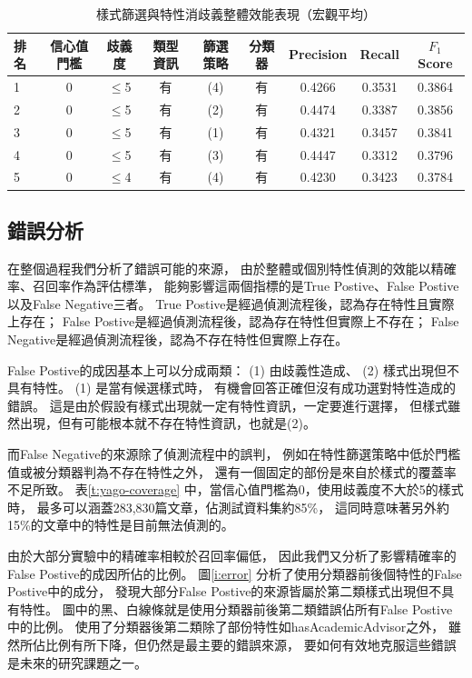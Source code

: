 \begin{table}
    \caption{樣式篩選與特性消歧義整體效能表現（宏觀平均）}
    \label{t:dis-ambi-overall-nbc}
    \footnotesize
    \begin{center}
        \begin{tabular}{|l||c|c||c|c|c||c|c|c|}
            \hline
            排名 & 信心值門檻 & 歧義度 & 類型資訊 & 篩選策略 & 分類器 & Precision & Recall & $F_1$ Score \\
            \hline
            1 & 0 & $\leq$5 & 有 & (4) & 有 & 0.4266 & 0.3531 & 0.3864 \\
            2 & 0 & $\leq$5 & 有 & (2) & 有 & 0.4474 & 0.3387 & 0.3856 \\
            3 & 0 & $\leq$5 & 有 & (1) & 有 & 0.4321 & 0.3457 & 0.3841 \\
            4 & 0 & $\leq$5 & 有 & (3) & 有 & 0.4447 & 0.3312 & 0.3796 \\
            5 & 0 & $\leq$4 & 有 & (4) & 有 & 0.4230 & 0.3423 & 0.3784 \\
            \hline
        \end{tabular}
    \end{center}
\end{table}

\subsection{錯誤分析}

在整個過程我們分析了錯誤可能的來源，
由於整體或個別特性偵測的效能以精確率、召回率作為評估標準，
能夠影響這兩個指標的是True Postive、False Postive以及False Negative三者。
True Postive是經過偵測流程後，認為存在特性且實際上存在；
False Postive是經過偵測流程後，認為存在特性但實際上不存在；
False Negative是經過偵測流程後，認為不存在特性但實際上存在。

False Postive的成因基本上可以分成兩類：
(1) 由歧義性造成、 (2) 樣式出現但不具有特性。
(1) 是當有候選樣式時，
有機會回答正確但沒有成功選對特性造成的錯誤。
這是由於假設有樣式出現就一定有特性資訊，一定要進行選擇，
但樣式雖然出現，但有可能根本就不存在特性資訊，也就是(2)。

而False Negative的來源除了偵測流程中的誤判，
例如在特性篩選策略中低於門檻值或被分類器判為不存在特性之外，
還有一個固定的部份是來自於樣式的覆蓋率不足所致。
表\ref{t:yago-coverage} 中，當信心值門檻為0，使用歧義度不大於5的樣式時，
最多可以涵蓋283,830篇文章，佔測試資料集約85\%，
這同時意味著另外約15\%的文章中的特性是目前無法偵測的。

由於大部分實驗中的精確率相較於召回率偏低，
因此我們又分析了影響精確率的False Postive的成因所佔的比例。
圖\ref{i:error} 分析了使用分類器前後個特性的False Postive中的成分，
發現大部分False Postive的來源皆屬於第二類樣式出現但不具有特性。
圖中的黑、白線條就是使用分類器前後第二類錯誤佔所有False Postive中的比例。
使用了分類器後第二類除了部份特性如hasAcademicAdvisor之外，
雖然所佔比例有所下降，但仍然是最主要的錯誤來源，
要如何有效地克服這些錯誤是未來的研究課題之一。

